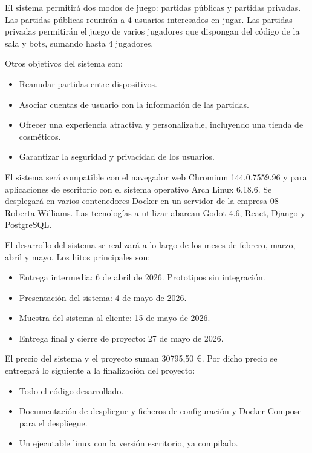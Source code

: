 \documentclass[11pt]{article}
\begin{document}
El sistema permitirá dos modos de juego: partidas públicas y
partidas privadas. Las partidas públicas reunirán a
4 usuarios interesados en jugar. Las partidas privadas
permitirán el juego de varios jugadores que dispongan del código de 
la sala y bots, sumando hasta
4 jugadores. 

Otros objetivos del sistema son:
\begin{itemize}
		\item Reanudar partidas entre dispositivos.
		\item Asociar cuentas de usuario con la información de las partidas.
		\item Ofrecer una experiencia atractiva y personalizable,
				incluyendo una tienda de cosméticos.
		\item Garantizar la seguridad y privacidad de los usuarios.
\end{itemize}

El sistema será compatible con el navegador web Chromium 144.0.7559.96 y
para aplicaciones de escritorio con el sistema operativo Arch Linux 6.18.6.
Se desplegará en varios 
contenedores Docker en un servidor de la empresa 08 -- Roberta Williams.
Las tecnologías a utilizar abarcan Godot 4.6, React, Django y PostgreSQL.

El desarrollo del sistema se realizará a lo largo de los meses de febrero,
marzo, abril y mayo. Los hitos principales son:
\begin{itemize}
		\item Entrega intermedia: 6 de abril de 2026. Prototipos sin integración.
		\item Presentación del sistema: 4 de mayo de 2026.
		\item Muestra del sistema al cliente: 15 de mayo de 2026.
		\item Entrega final y cierre de proyecto: 27 de mayo de 2026.
\end{itemize}

El precio del sistema y el proyecto suman 30795,50 €. 
Por dicho precio se entregará lo siguiente a la finalización del proyecto:
\begin{itemize}
		\item Todo el código desarrollado.
		\item Documentación de despliegue y ficheros de configuración y Docker Compose para el despliegue.
		\item Un ejecutable linux con la versión escritorio, ya compilado.
\end{itemize}
\end{document}
